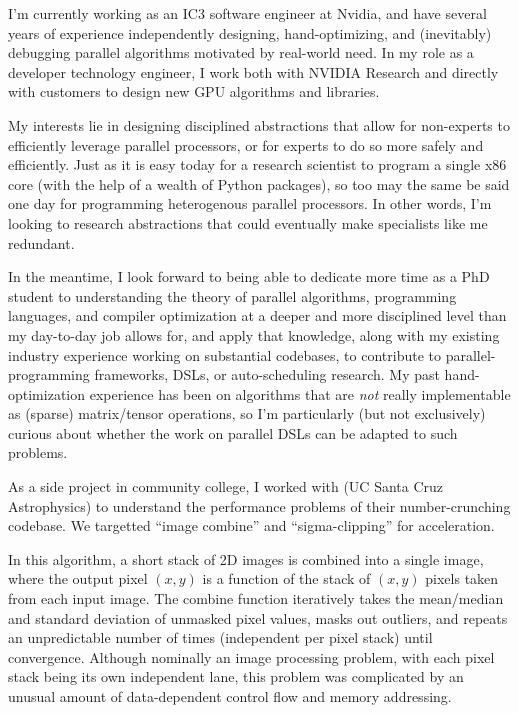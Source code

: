 


\raggedright
\reversemarginpar

I'm currently working as an IC3 software engineer at Nvidia, and have
several years of experience independently designing, hand-optimizing,
and (inevitably) debugging parallel algorithms motivated by real-world
need. In my role as a developer technology engineer, I work both with
NVIDIA Research and directly with customers to design new GPU
algorithms and libraries.

My interests lie in designing disciplined abstractions that allow for
non-experts to efficiently leverage parallel processors, or for
experts to do so more safely and efficiently. Just as it is easy today
for a research scientist to program a single x86 core (with the help
of a wealth of Python packages), so too may the same be said one day
for programming heterogenous parallel processors. In other words, I'm
looking to research abstractions that could eventually make
specialists like me redundant.

In the meantime, I look forward to being able to dedicate more time as
a PhD student to understanding the theory of parallel algorithms,
programming languages, and compiler optimization at a deeper and more
disciplined level than my day-to-day job allows for, and apply that
knowledge, along with my existing industry experience working on
substantial codebases, to contribute to parallel-programming
frameworks, DSLs, or auto-scheduling research. My past
hand-optimization experience has been on algorithms that
are \textit{not} really implementable as (sparse) matrix/tensor
operations, so I'm particularly (but not exclusively) curious about
whether the work on parallel DSLs can be adapted to such problems.

As a side project in community college, I worked
with  (UC Santa Cruz Astrophysics) to understand the performance
problems of their number-crunching codebase. We targetted ``image
combine'' and ``sigma-clipping'' for acceleration.

In this algorithm, a short stack of 2D images is combined into a
single image, where the output pixel $(x,y)$ is a function of the
stack of $(x,y)$ pixels taken from each input image.  The combine
function iteratively takes the mean/median and standard deviation of
unmasked pixel values, masks out outliers, and repeats an
unpredictable number of times (independent per pixel stack) until
convergence. Although nominally an image processing problem, with each
pixel stack being its own independent lane, this problem was
complicated by an unusual amount of data-dependent control flow and
memory addressing.

